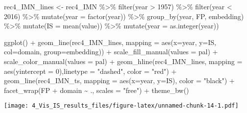 \documentclass[
]{article}
\newenvironment{Shaded}{\begin{snugshade}}{\end{snugshade}}
\newcommand{\AttributeTok}[1]{\textcolor[rgb]{0.77,0.63,0.00}{#1}}
\newcommand{\DecValTok}[1]{\textcolor[rgb]{0.00,0.00,0.81}{#1}}
\newcommand{\FunctionTok}[1]{\textcolor[rgb]{0.00,0.00,0.00}{#1}}
\newcommand{\NormalTok}[1]{#1}
\newcommand{\OtherTok}[1]{\textcolor[rgb]{0.56,0.35,0.01}{#1}}
\newcommand{\SpecialCharTok}[1]{\textcolor[rgb]{0.00,0.00,0.00}{#1}}
\newcommand{\StringTok}[1]{\textcolor[rgb]{0.31,0.60,0.02}{#1}}
\begin{document}
\begin{Shaded}
\begin{Highlighting}[]
\NormalTok{rec4\_IMN\_lines }\OtherTok{\textless{}{-}}\NormalTok{ rec4\_IMN }\SpecialCharTok{\%\textgreater{}\%} 
  \FunctionTok{filter}\NormalTok{(year }\SpecialCharTok{\textgreater{}} \DecValTok{1957}\NormalTok{) }\SpecialCharTok{\%\textgreater{}\%}
  \FunctionTok{filter}\NormalTok{(year }\SpecialCharTok{\textless{}} \DecValTok{2016}\NormalTok{) }\SpecialCharTok{\%\textgreater{}\%} 
  \FunctionTok{mutate}\NormalTok{(}\AttributeTok{year =} \FunctionTok{factor}\NormalTok{(year)) }\SpecialCharTok{\%\textgreater{}\%} 
  \FunctionTok{group\_by}\NormalTok{(year, FP, embedding) }\SpecialCharTok{\%\textgreater{}\%} 
  \FunctionTok{mutate}\NormalTok{(}\AttributeTok{IS =} \FunctionTok{mean}\NormalTok{(value)) }\SpecialCharTok{\%\textgreater{}\%} 
  \FunctionTok{mutate}\NormalTok{(}\AttributeTok{year =} \FunctionTok{as.integer}\NormalTok{(year))}


\FunctionTok{ggplot}\NormalTok{() }\SpecialCharTok{+}
  \FunctionTok{geom\_line}\NormalTok{(rec4\_IMN\_lines, }\AttributeTok{mapping =} \FunctionTok{aes}\NormalTok{(}\AttributeTok{x=}\NormalTok{year, }\AttributeTok{y=}\NormalTok{IS, }\AttributeTok{col=}\NormalTok{domain, }\AttributeTok{group=}\NormalTok{embedding)) }\SpecialCharTok{+} 
  \FunctionTok{scale\_fill\_manual}\NormalTok{(}\AttributeTok{values =}\NormalTok{ pal) }\SpecialCharTok{+}
  \FunctionTok{scale\_color\_manual}\NormalTok{(}\AttributeTok{values =}\NormalTok{ pal) }\SpecialCharTok{+}
  \FunctionTok{geom\_hline}\NormalTok{(rec4\_IMN\_lines, }\AttributeTok{mapping =} \FunctionTok{aes}\NormalTok{(}\AttributeTok{yintercept =} \DecValTok{0}\NormalTok{),}\AttributeTok{linetype =} \StringTok{"dashed"}\NormalTok{, }\AttributeTok{color =} \StringTok{"red"}\NormalTok{) }\SpecialCharTok{+}
  \FunctionTok{geom\_line}\NormalTok{(rec4\_IMN\_ts, }\AttributeTok{mapping =} \FunctionTok{aes}\NormalTok{(}\AttributeTok{x=}\NormalTok{year, }\AttributeTok{y=}\NormalTok{IS), }\AttributeTok{color =} \StringTok{"black"}\NormalTok{) }\SpecialCharTok{+}
  \FunctionTok{facet\_wrap}\NormalTok{(FP }\SpecialCharTok{+}\NormalTok{ domain }\SpecialCharTok{\textasciitilde{}}\NormalTok{ ., }\AttributeTok{scales =} \StringTok{"free"}\NormalTok{) }\SpecialCharTok{+}
  \FunctionTok{theme\_bw}\NormalTok{()}
\end{Highlighting}
\end{Shaded}

\texttt{[image: 4\_Vis\_IS\_results\_files/figure-latex/unnamed-chunk-14-1.pdf]}
\end{document}
